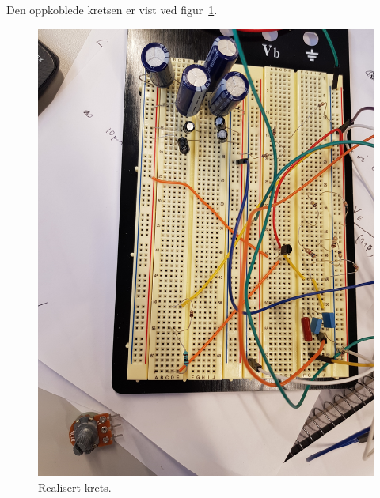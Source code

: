 \documentclass[a4paper,11pt,norsk]{article}
\begin{document}
\newpage

Den oppkoblede kretsen er vist ved figur~\ref{fig: first circuit}.
\begin{figure}[htbp]
    \centering
    \includegraphics[width=1.0\textwidth]{img/Initial_circuit.jpg}
    \caption{Realisert krets.}
    \label{fig: first circuit}
\end{figure}\\

\newpage
\end{document}
